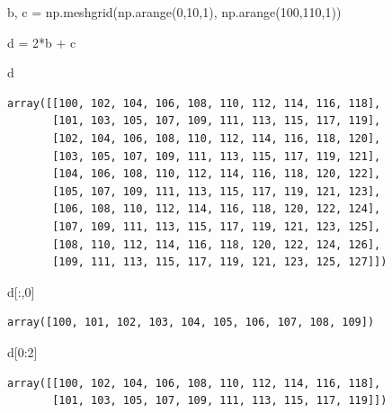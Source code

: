 \documentclass[
  letterpaper,
  DIV=11,
  numbers=noendperiod]{scrreprt}
\newenvironment{Shaded}{\begin{snugshade}}{\end{snugshade}}
\newcommand{\DecValTok}[1]{\textcolor[rgb]{0.68,0.00,0.00}{#1}}
\newcommand{\NormalTok}[1]{\textcolor[rgb]{0.00,0.23,0.31}{#1}}
\newcommand{\OperatorTok}[1]{\textcolor[rgb]{0.37,0.37,0.37}{#1}}
\begin{document}
\begin{Shaded}
\begin{Highlighting}[]
\NormalTok{b, c }\OperatorTok{=}\NormalTok{ np.meshgrid(np.arange(}\DecValTok{0}\NormalTok{,}\DecValTok{10}\NormalTok{,}\DecValTok{1}\NormalTok{), np.arange(}\DecValTok{100}\NormalTok{,}\DecValTok{110}\NormalTok{,}\DecValTok{1}\NormalTok{))}

\NormalTok{d }\OperatorTok{=} \DecValTok{2}\OperatorTok{*}\NormalTok{b }\OperatorTok{+}\NormalTok{ c}
\end{Highlighting}
\end{Shaded}

\begin{Shaded}
\begin{Highlighting}[]
\NormalTok{d}
\end{Highlighting}
\end{Shaded}

\begin{verbatim}
array([[100, 102, 104, 106, 108, 110, 112, 114, 116, 118],
       [101, 103, 105, 107, 109, 111, 113, 115, 117, 119],
       [102, 104, 106, 108, 110, 112, 114, 116, 118, 120],
       [103, 105, 107, 109, 111, 113, 115, 117, 119, 121],
       [104, 106, 108, 110, 112, 114, 116, 118, 120, 122],
       [105, 107, 109, 111, 113, 115, 117, 119, 121, 123],
       [106, 108, 110, 112, 114, 116, 118, 120, 122, 124],
       [107, 109, 111, 113, 115, 117, 119, 121, 123, 125],
       [108, 110, 112, 114, 116, 118, 120, 122, 124, 126],
       [109, 111, 113, 115, 117, 119, 121, 123, 125, 127]])
\end{verbatim}

\begin{Shaded}
\begin{Highlighting}[]
\NormalTok{d[:,}\DecValTok{0}\NormalTok{]}
\end{Highlighting}
\end{Shaded}

\begin{verbatim}
array([100, 101, 102, 103, 104, 105, 106, 107, 108, 109])
\end{verbatim}

\begin{Shaded}
\begin{Highlighting}[]
\NormalTok{d[}\DecValTok{0}\NormalTok{:}\DecValTok{2}\NormalTok{]}
\end{Highlighting}
\end{Shaded}

\begin{verbatim}
array([[100, 102, 104, 106, 108, 110, 112, 114, 116, 118],
       [101, 103, 105, 107, 109, 111, 113, 115, 117, 119]])
\end{verbatim}
\end{document}
